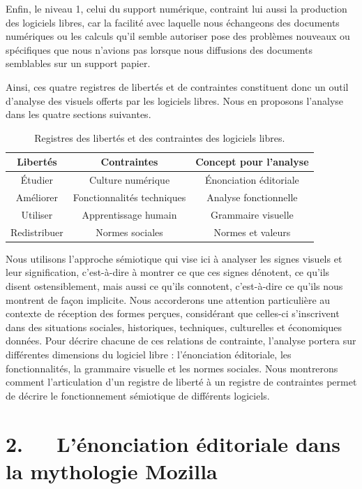 \documentclass{FramateX}
\begin{document}
\begin{refsection}
Enfin, le niveau 1, celui du support numérique, contraint lui aussi la
production des logiciels libres, car la facilité avec laquelle nous
échangeons des documents numériques ou les calculs qu'il semble
autoriser pose des problèmes nouveaux ou spécifiques que nous n'avions
pas lorsque nous diffusions des documents semblables sur un support
papier. 

Ainsi, ces quatre registres de libertés et de contraintes constituent
donc un outil d'analyse des visuels offerts par les logiciels libres.
Nous en proposons l'analyse dans les quatre sections suivantes. 




\begin{table}
\begin{tabular}{c|c|c}
 
\textbf{Libertés}  & \textbf{Contraintes}  & \textbf{Concept pour l'analyse} \\
\hline
Étudier  & Culture numérique  & Énonciation éditoriale \\
Améliorer  & Fonctionnalités techniques  & Analyse fonctionnelle \\
Utiliser  & Apprentissage humain  & Grammaire visuelle \\
Redistribuer  & Normes sociales  & Normes et valeurs \\
\hline 
\end{tabular} 
\caption{Registres des libertés et des contraintes des logiciels libres.}
\end{table}


Nous utilisons l'approche sémiotique qui vise ici à analyser les signes
visuels et leur signification, c'est-à-dire à montrer ce que ces signes
dénotent, ce qu'ils disent ostensiblement, mais aussi ce qu'ils
connotent, c'est-à-dire ce qu'ils nous montrent de façon implicite.
Nous accorderons une attention particulière au contexte de réception
des formes perçues, considérant que celles-ci s'inscrivent dans des
situations sociales, historiques, techniques, culturelles et
économiques données. Pour décrire chacune de ces relations de
contrainte, l'analyse portera sur différentes dimensions du logiciel
libre : l'énonciation éditoriale, les fonctionnalités, la grammaire
visuelle et les normes sociales. Nous montrerons comment
l'articulation d'un registre de liberté à un registre de contraintes
permet de décrire le fonctionnement sémiotique de différents logiciels.


\section*{2.~~~L'énonciation éditoriale dans la mythologie Mozilla}
{}


\end{refsection}
\end{document}

